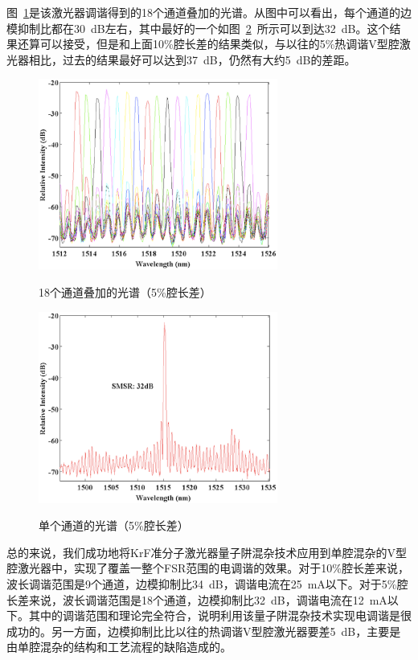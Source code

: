 \documentclass{ZJUthesis}
\begin{document}
图~\ref{fig_single_spectra_p5}是该激光器调谐得到的18个通道叠加的光谱。从图中可以看出，每个通道的边模抑制比都在30~dB左右，其中最好的一个如图~\ref{fig_single_spectrum_p5}~所示可以到达32~dB。这个结果还算可以接受，但是和上面10\%腔长差的结果类似，与以往的5\%热调谐V型腔激光器相比，过去的结果最好可以达到37~dB，仍然有大约5~dB的差距。

\begin{figure}[htbp]
  \centering
  \includegraphics[width=0.7\textwidth]{./Pictures/single_spectra_p5.eps}\\
  \caption{18个通道叠加的光谱（5\%腔长差）}
  \label{fig_single_spectra_p5}
\end{figure}

\begin{figure}[htbp]
  \centering
  \includegraphics[width=0.7\textwidth]{./Pictures/single_spectrum_p5.eps}\\
  \caption{单个通道的光谱（5\%腔长差）}
  \label{fig_single_spectrum_p5}
\end{figure}

总的来说，我们成功地将KrF准分子激光器量子阱混杂技术应用到单腔混杂的V型腔激光器中，实现了覆盖一整个FSR范围的电调谐的效果。对于10\%腔长差来说，波长调谐范围是9个通道，边模抑制比34~dB，调谐电流在25~mA以下。对于5\%腔长差来说，波长调谐范围是18个通道，边模抑制比32~dB，调谐电流在12~mA以下。其中的调谐范围和理论完全符合，说明利用该量子阱混杂技术实现电调谐是很成功的。另一方面，边模抑制比比以往的热调谐V型腔激光器要差5~dB，主要是由单腔混杂的结构和工艺流程的缺陷造成的。
\end{document}
